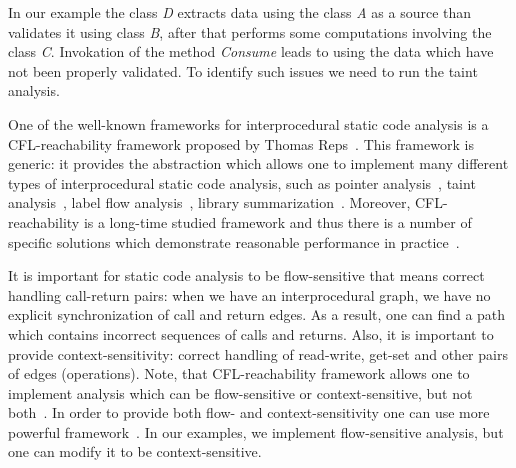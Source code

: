 In our example the class \textit{D} extracts data using the class \textit{A} as a source than validates it using class \textit{B}, after that performs some computations involving the class \textit{C}.
Invokation of the method \textit{Consume} leads to using the data which have not been properly validated.
To identify such issues we need to run the taint analysis.

One of the well-known frameworks for interprocedural static code analysis is a CFL-reachability framework proposed by Thomas Reps~\cite{Reps}.
This framework is generic: it provides the abstraction which allows one to implement many different types of interprocedural static code analysis, such as pointer analysis~\cite{Zheng, JavaCFL}, taint analysis~\cite{Huang:2015:SPT:2771783.2771803}, label flow analysis~\cite{10.1007/11823230_7,CFLr}, library summarization~\cite{10.1007/978-3-662-54434-1_33}.
Moreover, CFL-reachability is a long-time studied framework and thus there is a number of specific solutions which demonstrate reasonable performance in practice~\cite{Wang:2017:GSD:3093315.3037744}.

It is important for static code analysis to be flow-sensitive that means correct handling call-return pairs: when we have an interprocedural graph, we have no explicit synchronization of call and return edges.
As a result, one can find a path which contains incorrect sequences of calls and returns.
Also, it is important to provide context-sensitivity: correct handling of read-write, get-set and other pairs of edges (operations).
Note, that CFL-reachability framework allows one to implement analysis which can be flow-sensitive or context-sensitive, but not both~\cite{Reps:2000:UCD:345099.345137}.
In order to provide both flow- and context-sensitivity one can use more powerful framework~\cite{Zhang:2017:CDA:3093333.3009848}.
In our examples, we implement flow-sensitive analysis, but one can modify it to be context-sensitive.

